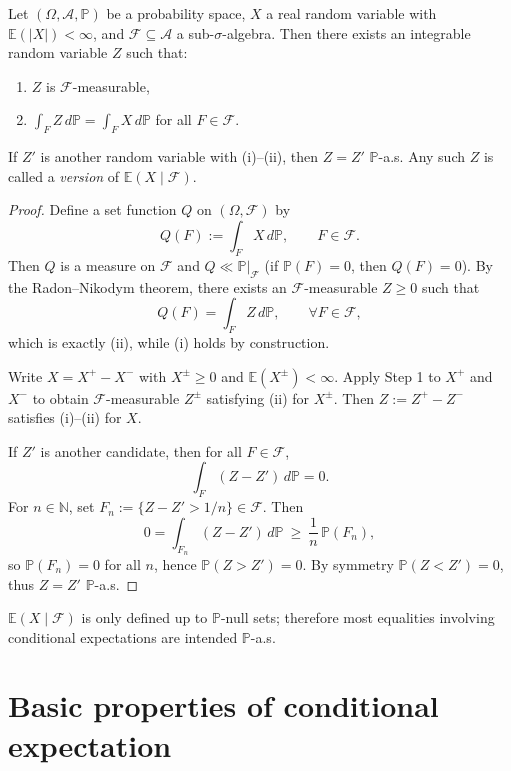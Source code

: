 \begin{theorem}
\label{thm:ce_existence}
Let $(\Omega,\mathcal A,\mathbb P)$ be a probability space, $X$ a real random variable with
$\mathbb E(|X|)<\infty$, and $\mathcal F\subseteq\mathcal A$ a sub-$\sigma$-algebra.
Then there exists an integrable random variable $Z$ such that:
\begin{enumerate}
\item[(i)] $Z$ is $\mathcal F$-measurable,
\item[(ii)] $\displaystyle \int_F Z\,d\mathbb P=\int_F X\,d\mathbb P$ for all $F\in\mathcal F$.
\end{enumerate}
If $Z'$ is another random variable with (i)--(ii), then $Z=Z'$ $\mathbb P$-a.s.
Any such $Z$ is called a \emph{version} of $\mathbb E(X\mid\mathcal F)$.
\end{theorem}

\begin{proof}
Define a set function $Q$ on $(\Omega,\mathcal F)$ by
\[
Q(F):=\int_F X\,d\mathbb P,\qquad F\in\mathcal F.
\]
Then $Q$ is a measure on $\mathcal F$ and $Q\ll \mathbb P|_{\mathcal F}$ (if $\mathbb P(F)=0$, then $Q(F)=0$).
By the Radon--Nikodym theorem, there exists an $\mathcal F$-measurable $Z\ge 0$ such that
\[
Q(F)=\int_F Z\,d\mathbb P,\qquad \forall F\in\mathcal F,
\]
which is exactly (ii), while (i) holds by construction.

Write $X=X^+-X^-$ with $X^\pm\ge 0$ and $\mathbb E(X^\pm)<\infty$.
Apply Step 1 to $X^+$ and $X^-$ to obtain $\mathcal F$-measurable $Z^\pm$ satisfying (ii) for $X^\pm$.
Then $Z:=Z^+-Z^-$ satisfies (i)--(ii) for $X$.

If $Z'$ is another candidate, then for all $F\in\mathcal F$,
\[
\int_F (Z-Z')\,d\mathbb P=0.
\]
For $n\in\mathbb N$, set $F_n:=\{Z-Z'>1/n\}\in\mathcal F$. Then
\[
0=\int_{F_n}(Z-Z')\,d\mathbb P\ \ge\ \frac1n\,\mathbb P(F_n),
\]
so $\mathbb P(F_n)=0$ for all $n$, hence $\mathbb P(Z>Z')=0$. By symmetry $\mathbb P(Z<Z')=0$,
thus $Z=Z'$ $\mathbb P$-a.s.
\end{proof}

\begin{remark}
$\mathbb E(X\mid\mathcal F)$ is only defined up to $\mathbb P$-null sets; therefore most equalities involving
conditional expectations are intended $\mathbb P$-a.s. 
\end{remark}

\section{Basic properties of conditional expectation}

